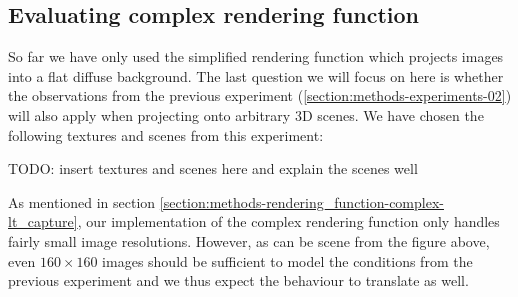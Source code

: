 \subsection{Evaluating complex rendering function}
\label{section:methods-experiments-03}

So far we have only used the simplified rendering function which projects images into a flat diffuse background. The last question we will focus on here is whether the observations from the previous experiment (\ref{section:methods-experiments-02}) will also apply when projecting onto arbitrary 3D scenes. We have chosen the following textures and scenes from this experiment:

{\color{red} TODO: insert textures and scenes here and explain the scenes well}

As mentioned in section \ref{section:methods-rendering_function-complex-lt_capture}, our implementation of the complex rendering function only handles fairly small image resolutions. However, as can be scene from the figure above, even \(160 \times 160\) images should be sufficient to model the conditions from the previous experiment and we thus expect the behaviour to translate as well.